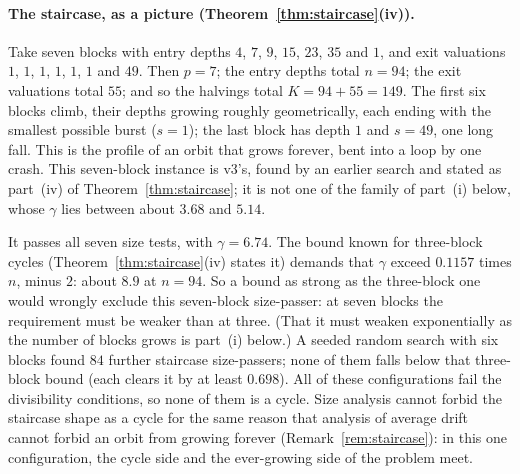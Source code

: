 \documentclass[11pt]{article}
\theoremstyle{remark}
\begin{document}
\paragraph{The staircase, as a picture (Theorem~\ref{thm:staircase}(iv)).} Take seven blocks with entry depths $4$, $7$, $9$, $15$, $23$, $35$ and $1$, and exit valuations $1$, $1$, $1$, $1$, $1$, $1$ and $49$. Then $p = 7$; the entry depths total $n = 94$; the exit valuations total $55$; and so the halvings total $K = 94 + 55 = 149$. The first six blocks climb, their depths growing roughly geometrically, each ending with the smallest possible burst ($s = 1$); the last block has depth $1$ and $s = 49$, one long fall. This is the profile of an orbit that grows forever, bent into a loop by one crash. This seven-block instance is v3's, found by an earlier search and stated as part~(iv) of Theorem~\ref{thm:staircase}; it is not one of the family of part~(i) below, whose $\gamma$ lies between about $3.68$ and $5.14$.

It passes all seven size tests, with $\gamma = 6.74$. The bound known for three-block cycles (Theorem~\ref{thm:staircase}(iv) states it) demands that $\gamma$ exceed $0.1157$ times $n$, minus $2$: about $8.9$ at $n = 94$. So a bound as strong as the three-block one would wrongly exclude this seven-block size-passer: at seven blocks the requirement must be weaker than at three. (That it must weaken exponentially as the number of blocks grows is part~(i) below.) A seeded random search with six blocks found $84$ further staircase size-passers; none of them falls below that three-block bound (each clears it by at least $0.698$). All of these configurations fail the divisibility conditions, so none of them is a cycle. Size analysis cannot forbid the staircase shape as a cycle for the same reason that analysis of average drift cannot forbid an orbit from growing forever (Remark~\ref{rem:staircase}): in this one configuration, the cycle side and the ever-growing side of the problem meet.
\end{document}
